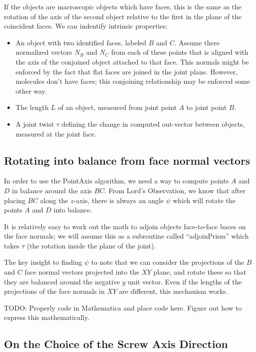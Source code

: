 \documentclass[11pt]{article}
\begin{document}
{If the objects are macroscopic objects which have faces, this is the same as the rotation
of the axis of the second object relative to the first in the plane of the coincident faces.
We can indentify intrinsic properties:

\begin{itemize}
\item An object with two identified faces, labeled $B$ and $C$. Assume there normalized
  vectors $N_B$ and $N_C$
  from each of these points that is aligned with the axis of the conjoined object attached to
  that face. This normals might be enforced by the fact that flat faces are joined in the joint plane.
  However, molecules don't have faces; this conjoining relationship may be enforced some other way.
\item The length $L$ of an object, measured from joint point $A$ to joint point $B$.
\item A joint twist $\tau$ defining the change in computed out-vector between objects,
  measured at the joint face.
\end{itemize}

\subsection{Rotating into balance from face normal vectors}

In order to use the PointAxis algorithm, we need a way
to compute points $A$ and $D$ in balance around the axis $BC$.
From Lord's Observation, we know that after placing $BC$ along
the $z$-axis, there is always an angle $\psi$ which will
rotate the points $A$ and $D$ into balance.

It is relatively easy to work out the math to adjoin objects
face-to-face baces on the face normals; we will assume this
as a subroutine called ``adjoinPrism'' which takes $\tau$
(the rotation inside the plane of the joint).

The key insight to finding $\psi$ to note that we
can consider the projections of the $B$ and $C$ face normal vectors
projected into the $XY$ plane, and rotate these so that they
are balanced around the negative $y$ unit vector. Even
if the lengths of the projections of the face normals in $XY$
are different, this mechanism works.

TODO: Properly code in Mathematica and place code here.
Figure out how to express this mathematically.

\subsection{On the Choice of the Screw Axis Direction}

}
\end{document}
